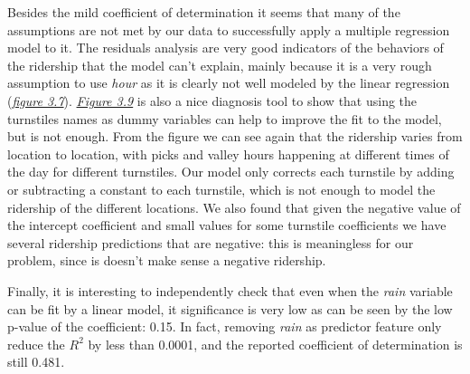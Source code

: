 \documentclass[a4paper,12pt,english]{sphinxmanual}
\begin{document}
Besides the mild coefficient of determination it seems that many of the assumptions
are not met by our data to successfully apply a multiple regression model to it. The
residuals analysis are very good indicators of the behaviors of the ridership that the
model can't explain, mainly because it is a very rough assumption to use \emph{hour} as it is
clearly not well modeled by the linear regression ({\hyperref[section2:figure37]{\emph{figure 3.7}}}).
{\hyperref[section2:figure39]{\emph{Figure 3.9}}} is also a nice diagnosis tool to
show that using the turnstiles names as dummy variables can help to improve the fit to
the model, but is not enough. From the figure we can see again that the ridership varies
from location to location, with picks and valley hours happening at different times of
the day for different turnstiles. Our model only corrects each turnstile by adding or
subtracting a constant to each turnstile, which is not enough to model the ridership
of the different locations. We also found that given the negative value of the intercept
coefficient and small values for some turnstile coefficients we have several ridership
predictions that are negative: this is meaningless for our problem, since is doesn't make
sense a negative ridership.

Finally, it is interesting to independently check that even when the \emph{rain} variable can
be fit by a linear model, it significance is very low as can be seen by the low p-value
of the coefficient: 0.15. In fact, removing \emph{rain} as predictor feature only reduce the
\(R^2\) by less than 0.0001, and the reported coefficient of determination is
still 0.481.
\end{document}

